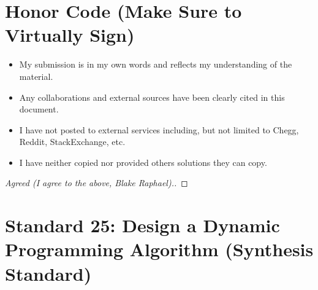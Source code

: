 \documentclass[11pt]{article}
\theoremstyle{definition}
\theoremstyle{definition}
\theoremstyle{definition}
\begin{document}
\section{Honor Code (Make Sure to Virtually Sign)} \label{HonorCode}

\begin{itemize}
\item My submission is in my own words and reflects my understanding of the material.
\item Any collaborations and external sources have been clearly cited in this document.
\item I have not posted to external services including, but not limited to Chegg, Reddit, StackExchange, etc.
\item I have neither copied nor provided others solutions they can copy.
\end{itemize}


\begin{proof}[Agreed (I agree to the above, Blake Raphael).]
\end{proof}
\newpage
\section{Standard 25: Design a Dynamic Programming Algorithm (Synthesis Standard)}
\end{document}
